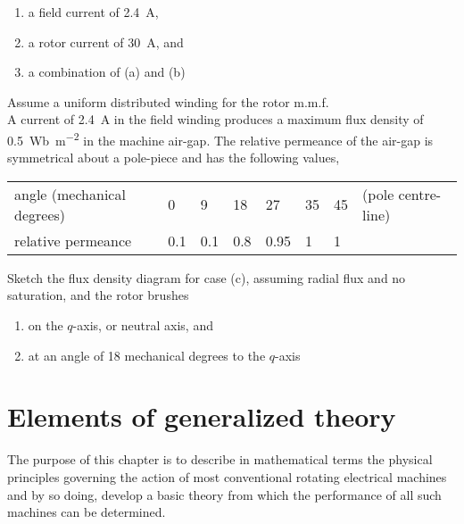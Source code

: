 \documentclass[a4paper,numbers=noenddot,12pt]{scrbook}
\begin{document}
\begin{enumerate}[label={\thechapter.\arabic*},leftmargin=*]
\begin{enumerate}
                        \item a field current of \SI{2.4}{\ampere},
                        \item a rotor current of \SI{30}{\ampere}, and
                        \item a combination of (a) and (b)
                    \end{enumerate}
                    Assume a uniform distributed winding for the rotor m.m.f.\\
                    A current of \SI{2.4}{\ampere} in the field winding produces a maximum flux density of \SI{0.5}{\weber\per\square\meter} in the machine air-gap. The relative permeance of the air-gap is symmetrical about a pole-piece and has the following values,\\
                    \begin{tabular}{l m{0.25cm}p{0.25cm}p{0.25cm}p{0.25cm}p{0.25cm}p{0.25cm}l}
                        angle (mechanical degrees)& 0  & 9  & 18  & 27   & 35  & 45 & (pole centre-line) \\
                        relative permeance        &0.1 & 0.1& 0.8 & 0.95 & 1   & 1  & \\
                    \end{tabular}

                    Sketch the flux density diagram for case (c), assuming radial flux and no saturation, and the rotor brushes
                    \begin{enumerate}[resume]
                        \item on the $q$-axis, or neutral axis, and
                        \item at an angle of 18 mechanical degrees to the $q$-axis
                    \end{enumerate} 
            \end{enumerate}
        \endgroup

        \chapter{Elements of generalized theory}
        The purpose of this chapter is to describe in mathematical terms the physical principles governing the action of most conventional rotating electrical machines and by so doing, develop a basic theory from which the performance of all such machines can be determined. 
\end{document}
